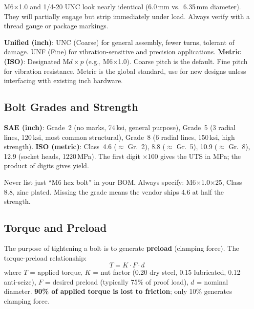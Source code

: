 \begin{tipbox}
M6$\times$1.0 and 1/4-20 UNC look nearly identical (6.0\,mm vs.\ 6.35\,mm diameter). They will partially engage but strip immediately under load. Always verify with a thread gauge or package markings.
\end{tipbox}

\textbf{Unified (inch)}: UNC (Coarse) for general assembly, fewer turns, tolerant of damage. UNF (Fine) for vibration-sensitive and precision applications. \textbf{Metric (ISO)}: Designated M$d \times p$ (e.g., M6$\times$1.0). Coarse pitch is the default. Fine pitch for vibration resistance. Metric is the global standard, use for new designs unless interfacing with existing inch hardware.

\subsection{Bolt Grades and Strength}



\textbf{SAE (inch)}: Grade~2 (no marks, 74\,ksi, general purpose), Grade~5 (3 radial lines, 120\,ksi, most common structural), Grade~8 (6 radial lines, 150\,ksi, high strength). \textbf{ISO (metric)}: Class~4.6 ($\approx$ Gr.~2), 8.8 ($\approx$ Gr.~5), 10.9 ($\approx$ Gr.~8), 12.9 (socket heads, 1220\,MPa). The first digit $\times$100 gives the UTS in MPa; the product of digits gives yield.

\begin{tipbox}
Never list just ``M6 hex bolt'' in your BOM. Always specify: M6$\times$1.0$\times$25, Class 8.8, zinc plated. Missing the grade means the vendor ships 4.6 at half the strength.
\end{tipbox}

\subsection{Torque and Preload}
The purpose of tightening a bolt is to generate \textbf{preload} (clamping force). The torque-preload relationship:
\begin{equation}
T = K \cdot F \cdot d
\end{equation}
where $T$ = applied torque, $K$ = nut factor (0.20 dry steel, 0.15 lubricated, 0.12 anti-seize), $F$ = desired preload (typically 75\% of proof load), $d$ = nominal diameter. \textbf{90\% of applied torque is lost to friction}; only 10\% generates clamping force.

